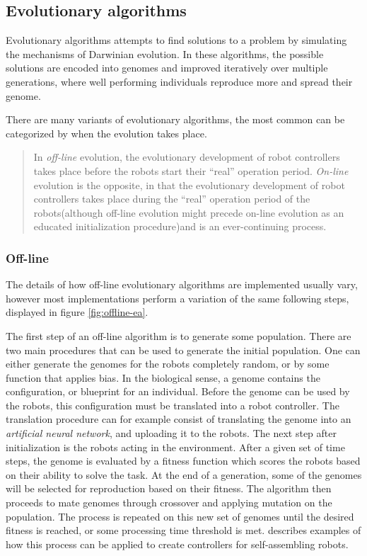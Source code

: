 \subsection{Evolutionary algorithms}
\label{sec:evo_alg}
Evolutionary algorithms attempts to find solutions to a problem by simulating the mechanisms of Darwinian evolution\cite{trianni_evolving_2004}.
In these algorithms, the possible solutions are encoded into genomes and improved iteratively over multiple generations, where well performing individuals reproduce more and spread their genome.

There are many variants of evolutionary algorithms, the most common can be categorized by when the evolution takes place\cite{eiben_embodied_2010}.
\begin{quote} 
	In \emph{off-line} evolution, the evolutionary development of robot controllers takes place before the robots start their “real” operation period.
	\emph{On-line} evolution is the opposite, in that the evolutionary development of robot controllers takes place during the “real” operation period of the robots(although off-line evolution might precede on-line evolution as an educated initialization procedure)and is an ever-continuing process.\cite{eiben_embodied_2010}
\end{quote} 


\subsubsection*{Off-line}
The details of how off-line evolutionary algorithms are implemented usually vary, however most implementations perform a variation of the same following steps\cite{doncieux_evolutionary_2011}, displayed in figure \ref{fig:offline-ea}. 

The first step of an off-line algorithm is to generate some population.
There are two main procedures that can be used to generate the initial population.	 
One can either generate the genomes for the robots completely random, or by some function that applies bias.
In the biological sense, a genome contains the configuration, or blueprint for an individual.
Before the genome can be used by the robots, this configuration must be translated into a robot controller.
The translation procedure can for example consist of translating the genome into an \emph{artificial neural network}, and uploading it to the robots.
The next step after initialization is the robots acting in the environment.
After a given set of time steps, the genome is evaluated by a fitness function which scores the robots based on their ability to solve the task.	 
At the end of a generation, some of the genomes will be selected for reproduction based on their fitness.	 
The algorithm then proceeds to mate genomes through crossover and applying mutation on the population.	 
The process is repeated on this new set of genomes until the desired fitness is reached, or some processing time threshold is met.
\cite{trianni_evolving_2004}\cite{li_co-evolution_2015} describes examples of how this process can be applied to create controllers for self-assembling robots. 

